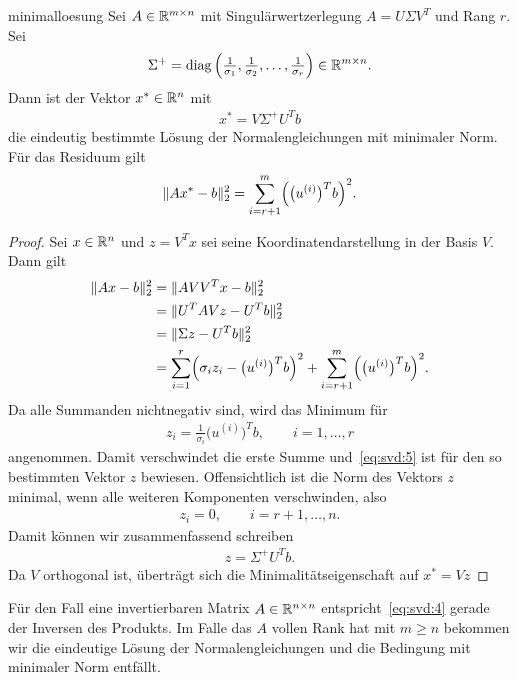 \begin{Satz}{minimalloesung}
  Sei $A\in\mathbb R^{m\times n}$ mit Singulärwertzerlegung $A=U\Sigma V^T$
  und Rang $r$. Sei
  \begin{gather}
    \Sigma^+ = \operatorname{diag}\left(\tfrac1{\sigma_1},\tfrac1{\sigma_2},\dots,\tfrac1{\sigma_r}\right) \in \mathbb R^{m\times n}.
  \end{gather}
  Dann ist der Vektor $x^*\in \mathbb R^n$ mit
  \begin{gather}
    \label{eq:svd:4}
    x^* = V \Sigma^+ U^T b
  \end{gather}
  die eindeutig bestimmte Lösung der Normalengleichungen mit minimaler
  Norm. Für das Residuum gilt
  \begin{gather}
    \label{eq:svd:5}
    \lVert Ax^*-b\rVert_2^2 = \sum_{i=r+1}^m \Bigl(\bigl(u^{(i)}\bigr)^T b\Bigr)^2.
  \end{gather}
\end{Satz}

\begin{proof}
  Sei $x\in \mathbb R^n$ und $z=V^T x$ sei seine Koordinatendarstellung in
  der Basis $V$. Dann gilt
  \begin{align}
    \lVert Ax-b\rVert_2^2
    &= \lVert AVV^Tx - b\rVert_2^2\\
    &= \lVert U^TAV z - U^Tb\rVert_2^2\\
    &= \lVert\Sigma z - U^T b\rVert_2^2\\
    &= \sum_{i=1}^r \Bigl(\sigma_iz_i - \bigl(u^{(i)}\bigr)^T b\Bigr)^2
      +\sum_{i=r+1}^m \Bigr(\bigl(u^{(i)}\bigr)^T b\Bigr)^2.
  \end{align}
  Da alle Summanden nichtnegativ sind, wird das Minimum für
  \begin{gather}
    z_i = \frac1{\sigma_i}\bigl(u^{(i)}\bigr)^T b, \qquad i=1,\dots,r
  \end{gather}
  angenommen. Damit verschwindet die erste Summe und~\eqref{eq:svd:5}
  ist für den so bestimmten Vektor $z$ bewiesen. Offensichtlich ist
  die Norm des Vektors $z$ minimal, wenn alle weiteren Komponenten
  verschwinden, also
  \begin{gather}
    z_i=0,\qquad i=r+1,\dots,n.
  \end{gather}
  Damit können wir zusammenfassend schreiben
  \begin{gather}
    z = \Sigma^+ U^T b.
  \end{gather}
  Da $V$ orthogonal ist, überträgt sich die Minimalitätseigenschaft auf $x^*=Vz$
\end{proof}

\begin{remark}
  Für den Fall eine invertierbaren Matrix $A\in\mathbb R^{n\times n}$
  entspricht~\eqref{eq:svd:4} gerade der Inversen des Produkts. Im
  Falle das $A$ vollen Rank hat mit $m\ge n$ bekommen wir die
  eindeutige Lösung der Normalengleichungen und die Bedingung \glqq
  mit minimaler Norm\grqq{} entfällt.
\end{remark}

